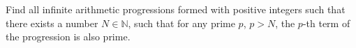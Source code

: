 Find all infinite arithmetic progressions formed with positive integers such that there exists a number $N \in \mathbb{N}$, such that for any prime $p$, $p > N$,
the $p$-th term of the progression is also prime.